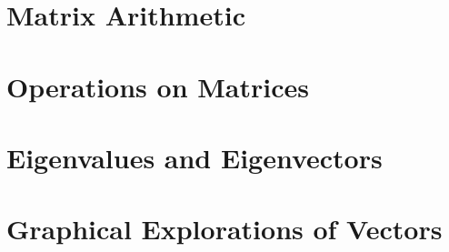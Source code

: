 \documentclass[10pt]{book}
\begin{document}


\clearpage{\pagestyle{empty}\cleardoublepage}

\chapter{Matrix Arithmetic}\label{chapter:arithmetic}
\thispagestyle{empty}















\clearpage{\pagestyle{empty}\cleardoublepage}

\chapter{Operations on Matrices}\label{chapter:ops}
\thispagestyle{empty}











\clearpage{\pagestyle{empty}\cleardoublepage}

\chapter{Eigenvalues and Eigenvectors}\label{chapter:eigen}
\thispagestyle{empty}




%
\clearpage{\pagestyle{empty}\cleardoublepage}

\chapter{Graphical Explorations of Vectors}\label{chapter:graph}
\thispagestyle{empty}







\appendix
%

\clearpage{\pagestyle{empty}\cleardoublepage}
{}
\printindex
%
\end{document}
